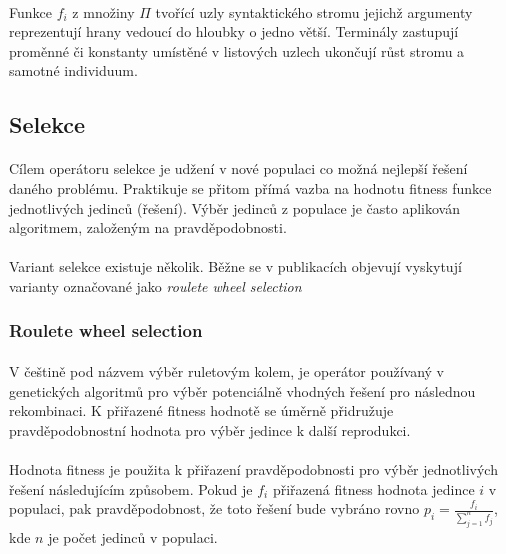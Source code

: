 \documentclass[bc,male,java,dept460]{diploma}		%
\begin{document}
\paragraph*{}
Funkce $f_i$ z množiny $\Pi$ tvořící uzly syntaktického stromu jejichž argumenty reprezentují hrany vedoucí do hloubky o jedno větší. Terminály zastupují proměnné či konstanty umístěné v listových uzlech ukončují růst stromu a samotné individuum.

\subsection{Selekce}
\paragraph*{}
Cílem operátoru selekce je udžení v nové populaci co možná nejlepší řešení daného problému. Praktikuje se přitom přímá vazba na hodnotu fitness funkce jednotlivých jedinců (řešení). Výběr jedinců z populace je často aplikován  algoritmem, založeným na pravděpodobnosti.

\paragraph*{}
Variant selekce existuje několik. Běžne se v publikacích objevují vyskytují varianty označované jako \textit{roulete wheel selection}

\subsubsection*{Roulete wheel selection}
\paragraph*{}
V češtině pod názvem výběr ruletovým kolem, je operátor používaný v genetických algoritmů pro výběr potenciálně vhodných řešení pro následnou rekombinaci. K přiřazené fitness hodnotě se úměrně přidružuje pravděpodobnostní hodnota pro výběr jedince k další reprodukci. 

\paragraph*{}
Hodnota fitness je použita k přiřazení pravděpodobnosti pro výběr jednotlivých řešení následujícím způsobem. Pokud je $f_i$ přiřazená fitness hodnota jedince $i$ v populaci, pak pravděpodobnost, že toto řešení bude vybráno rovno $p_i=\frac{f_i}{\sum\limits_{j=1}^n f_j}$, kde $n$ je počet jedinců v populaci.
\end{document}

